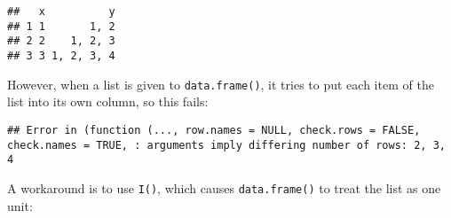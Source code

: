 \begin{Shaded}
\begin{Highlighting}[]
\StringTok{ }\NormalTok{(} \OperatorTok{:}\NormalTok{)}
\OperatorTok{$}\StringTok{ }\NormalTok{(}\OperatorTok{:}\NormalTok{, }\OperatorTok{:}\NormalTok{, }\OperatorTok{:}\NormalTok{)}
\end{Highlighting}
\end{Shaded}

\begin{verbatim}
##   x          y
## 1 1       1, 2
## 2 2    1, 2, 3
## 3 3 1, 2, 3, 4
\end{verbatim}

However, when a list is given to \texttt{data.frame()}, it tries to put
each item of the list into its own column, so this fails:

\begin{Shaded}
\begin{Highlighting}[]
\NormalTok{(} \OperatorTok{:}\NormalTok{, } \NormalTok{(}\OperatorTok{:}\NormalTok{, }\OperatorTok{:}\NormalTok{, }\OperatorTok{:}\NormalTok{))}
\end{Highlighting}
\end{Shaded}

\begin{verbatim}
## Error in (function (..., row.names = NULL, check.rows = FALSE, check.names = TRUE, : arguments imply differing number of rows: 2, 3, 4
\end{verbatim}

A workaround is to use \texttt{I()}, which causes \texttt{data.frame()}
to treat the list as one unit:

\begin{Shaded}
\begin{Highlighting}[]
\StringTok{ }\NormalTok{(} \OperatorTok{:}\NormalTok{, } \NormalTok{(}\NormalTok{(}\OperatorTok{:}\NormalTok{, }\OperatorTok{:}\NormalTok{, }\OperatorTok{:}\NormalTok{)))}
\end{Highlighting}
\end{Shaded}

